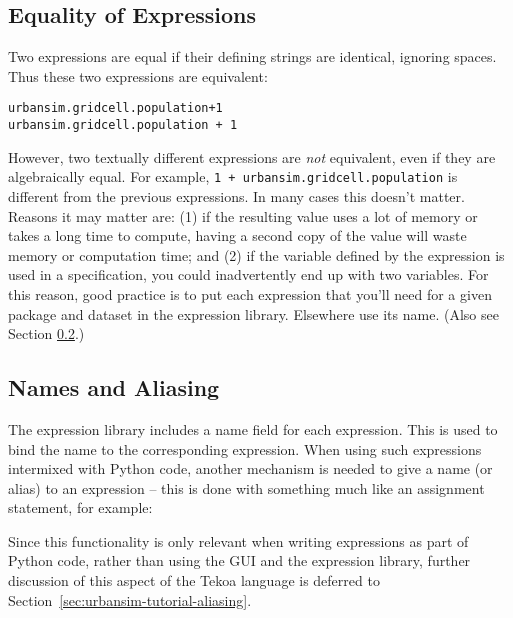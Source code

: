 \subsection{Equality of Expressions}
\label{sec:expression-equality}

Two expressions are equal if their defining strings are identical, ignoring
spaces.  Thus these two expressions are equivalent:

\begin{verbatim}
urbansim.gridcell.population+1
urbansim.gridcell.population + 1
\end{verbatim}

However, two textually different expressions are \emph{not} equivalent,
even if they are algebraically equal.  For example,
\verb|1 + urbansim.gridcell.population| is different from the previous
expressions.  In many cases this doesn't matter.  Reasons it may matter
are: (1) if the resulting value uses a lot of memory or takes a long time
to compute, having a second copy of the value will waste memory or
computation time; and (2) if the variable defined by the expression is used
in a specification, you could inadvertently end up with two variables.  For
this reason, good practice is to put each expression that you'll need for a
given package and dataset in the expression library.  Elsewhere use its
name.  (Also see Section \ref{sec:expressions-aliasing}.)

\subsection{Names and Aliasing}
\label{sec:expressions-aliasing}

The expression library includes a name field for each expression.  This is
used to bind the name to the corresponding expression.  When using such
expressions intermixed with Python code, another mechanism is needed to
give a name (or alias) to an expression -- this is done with something much
like an assignment statement, for example:


Since this functionality is only relevant when writing expressions as part
of Python code, rather than using the GUI and the expression library,
further discussion of this aspect of the Tekoa language is deferred to
Section~\ref{sec:urbansim-tutorial-aliasing}.
